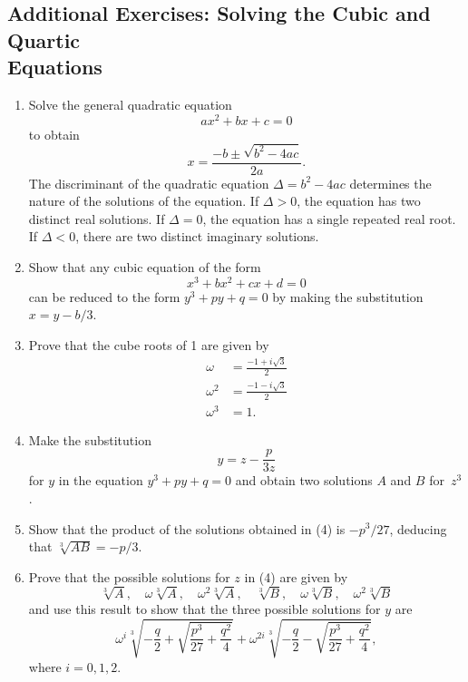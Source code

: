 \subsection*{Additional Exercises:  Solving the Cubic and Quartic \\
Equations}

{\small
 
\begin{enumerate}
 
\item
Solve the general quadratic equation 
\[
ax^2 + bx + c = 0
\]
to obtain
\[
x = \frac{-b \pm \sqrt{b^2 - 4ac}}{2a}.
\]
The {\bfi discriminant\/} of the quadratic equation $\Delta = b^2 - 4ac$ determines the nature of the solutions of the equation.  If $\Delta > 0$, the equation has two distinct real solutions.  If $\Delta = 0$, the equation has a single repeated real root. If $\Delta < 0$, there are two distinct imaginary solutions. 

\item
Show that any cubic equation of the form
\[
x^3 + bx^2 + cx + d = 0
\]
can be reduced to the form $y^3 + py + q = 0$ by making the substitution $x = y - b/3$.

\item
Prove that the cube roots of 1 are given by
\begin{align*}
\omega & = \frac{-1+ i \sqrt{3}}{2} \\
\omega^2 & = \frac{-1- i \sqrt{3}}{2} \\
\omega^3 & = 1.
\end{align*}

\item
Make the substitution 
\[
y = z - \frac{p}{3 z}
\]
for $y$ in the equation $y^3 + py + q = 0$ and obtain two solutions $A$ and $B$ for~$z^3$.

\item
Show that the product of the solutions obtained in (4) is $-p^3/27$, deducing that $\sqrt[3]{A B} = -p/3$.

\item 
Prove that the possible solutions for $z$ in (4) are given by 
\[
\sqrt[3]{A}, \quad \omega \sqrt[3]{A}, \quad \omega^2 \sqrt[3]{A}, \quad
\sqrt[3]{B}, \quad \omega \sqrt[3]{B}, \quad \omega^2 \sqrt[3]{B}
\]
and use this result to show that the three possible solutions for $y$
are 
\[
\omega^i \sqrt[3]{-\frac{q}{2}+ \sqrt{\frac{p^3}{27}  + \frac{q^2}{4}}  } +
\omega^{2i} \sqrt[3]{-\frac{q}{2}- \sqrt{\frac{p^3}{27}  + \frac{q^2}{4}}  },
\]
where $i = 0, 1, 2$.
 

\end{enumerate}}
